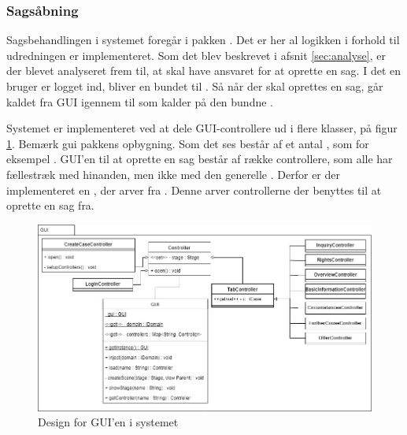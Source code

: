 \documentclass[../../main.tex]{subfiles}
\begin{document}
\subsubsection{Sagsåbning}
Sagsbehandlingen i systemet foregår i pakken . Det er her al logikken i forhold til udredningen er implementeret. Som det blev beskrevet i afsnit \ref{sec:analyse}, er der blevet analyseret frem til, at  skal have ansvaret for at oprette en sag. I det en bruger er logget ind, bliver en  bundet til . Så når der skal oprettes en sag, går kaldet fra GUI igennem  til  som kalder  på den bundne .

Systemet er implementeret ved at dele GUI-controllere ud i flere klasser, på figur \ref{fig:gui_design}. Bemærk gui pakkens opbygning. Som det ses består  af et antal , som for eksempel . GUI’en til at oprette en sag består af række controllere, som alle har fællestræk med hinanden, men ikke med den generelle . Derfor er der implementeret en , der arver fra . Denne  arver controllerne der benyttes til at oprette en sag fra.

\begin{center}
\begin{figure}[H]
  \centering
  \includegraphics[scale=.5]{figurer/gui_create_case.jpg}
  \caption{Design for GUI'en i systemet}
  \label{fig:gui_design}
\end{figure}
\end{center}
\end{document}
